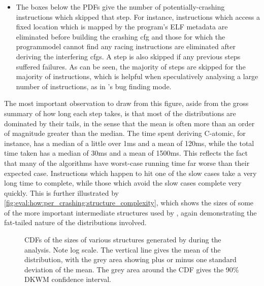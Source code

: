 \begin{itemize}
  across the figure.  In this case, nine instructions reached the five
  minute timeout during {\StateMachine} simplification, one reached
  the timeout while deriving the interfering \glspl{cfg}, and three
  instructions ran out of memory while deriving the interfering
  \glspl{cfg}.  Note that the timeout runs from the start of the
  ``build crashing \gls{cfg}'' step, rather than from the start of the
  current step.
\item The boxes below the PDFs give the number of potentially-crashing
  instructions which skipped that step.  For instance, instructions
  which access a fixed location which is mapped by the program's ELF
  metadata are eliminated before building the crashing \gls{cfg} and
  those for which the \gls{programmodel} cannot find any racing
  instructions are eliminated after deriving the interfering
  \glspl{cfg}.  A step is also skipped if any previous steps suffered
  failures.  As can be seen, the majority of steps are skipped for the
  majority of instructions, which is helpful when speculatively
  analysing a large number of instructions, as in {\technique}'s bug
  finding mode.
\end{itemize}
The most important observation to draw from this figure, aside from
the gross summary of how long each step takes, is that most of the
distributions are dominated by their tails, in the sense that the mean
is often more than an order of magnitude greater than the median.  The
time spent deriving C-atomic, for instance, has a median of a little
over 1ms and a mean of 120ms, while the total time taken has a median
of 30ms and a mean of 1500ms.  This reflects the fact that many of the
algorithms have worst-case running time far worse than their expected
case.  Instructions which happen to hit one of the slow cases take a
very long time to complete, while those which avoid the slow cases
complete very quickly.  This is further illustrated by
\autoref{fig:eval:how:per_crashing:structure_complexity}, which shows
the sizes of some of the more important intermediate structures used
by {\technique}, again demonstrating the fat-tailed nature of the
distributions involved.

\begin{figure}
  \centerline{
  }
  \caption{CDFs of the sizes of various structures generated by
    {\technique} during the analysis.  Note log scale.  The vertical
    line gives the mean of the distribution, with the grey area
    showing plus or minus one standard deviation of the mean.  The
    grey area around the CDF gives the 90\% DKWM confidence
    interval. \label{fig:eval:how:per_crashing:structure_complexity}}
\end{figure}

